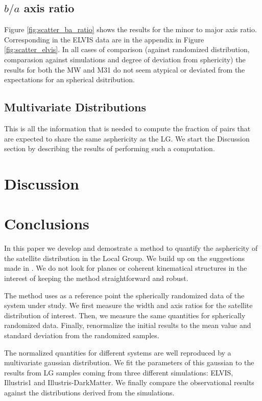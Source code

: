 \documentclass[a4paper,fleqn,usenatbib]{mnras}
\begin{document}
\subsection{$b/a$ axis ratio}

Figure \ref{fig:scatter_ba_ratio} shows the results for the minor to
major axis ratio. 
Corresponding in the ELVIS data are in the appendix in Figure
\ref{fig:scatter_elvis}.
In all cases of comparison (against randomized distribution,
comparasion against simulations and degree of deviation from
sphericity) the results for both the MW and M31 do not seem atypical
or deviated from the expectations for an spherical dsitribution.



\subsection{Multivariate Distributions}

This is all the information that is needed to compute the fraction of
pairs that are expected to share the same asphericity as the LG.
We start the Discussion section by describing the results of
performing such a computation.



\section{Discussion}





\section{Conclusions}

In this paper we develop and demostrate a method to quantify the
asphericity of the satellite distribution in the Local Group.
We build up on the suggestions made in \cite{XX}.
We do not look for planes  or coherent kinematical structures in the
interest of keeping the method straightforward and robust.

The method uses as a reference point the spherically randomized data
of the system under study.
We first measure the width and axis ratios for the satellite
distribution of interest. 
Then, we measure the same quantities for spherically
randomized data. 
Finally, renormalize the initial results to the mean value and
standard deviation from the randomized samples.  

The normalized quantities for different systems are well reproduced by
a multivariate gaussian distribution. 
We fit the parameters of this gaussian to the results from 
LG samples coming from three different simulations: ELVIS, Illustris1
and Illustris-DarkMatter.
We finally compare the observational results against the distributions
derived from the simulations.
\end{document}

